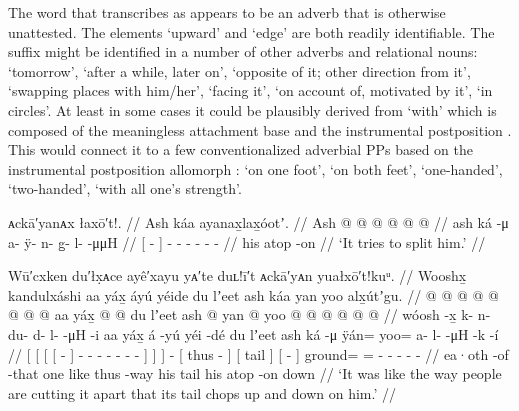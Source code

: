 The word that \citeauthor{swanton:1909} transcribes as  appears to be an adverb that is otherwise unattested.
The elements  ‘upward’ and  ‘edge’ are both readily identifiable.
The suffix  might be identified in a number of other adverbs and relational nouns:  ‘tomorrow’,  ‘after a while, later on’,  ‘opposite of it; other direction from it’,  ‘swapping places with him/her’,  ‘facing it’,  ‘on account of, motivated by it’,  ‘in circles’.
At least in some cases it could be plausibly derived from  ‘with’ which is composed of the meaningless attachment base  and the instrumental postposition .
This would connect it to a few conventionalized adverbial PPs based on the instrumental postposition allomorph :  ‘on one foot’,  ‘on both feet’,  ‘one-handed’,  ‘two-handed’,  ‘with all one’s strength’.

\ex\label{ex:91-239-split-him}%
%
\begingl
	\glpreamble	ᴀckā′yanᴀx łaxō′t!. //
	\glpreamble	Ash káa ayanax̱lax̱óotʼ. //
	\gla	{} Ash  @ {} {}
		 @ {} @ {} @ {} @ {} @ {} //
	\glb	{} ash ká -μ {}
		a- ÿ- n- g̱- l-  -μμH //
	\glc	{}[   - {}]
		- - - - -  - //
	\gld	{} his atop -on {}
		 {} {} {} {} {} //
	\glft	‘It tries to split him.’
		//
\endgl
\xe

\ex\label{ex:91-240-like-cut-apart-tail-repeatedly-chops}%
%
\begingl
	\glpreamble	Wū′cxken du′łx̣ᴀce ayê′xayu yᴀ′te duʟ!ī′t ᴀckā′yᴀn yuałxō′t!kuᵘ. //
	\glpreamble	Wooshx̱ kandulxáshi aa yáx̱ áyú yéide du lʼeet ash káa yan yoo alx̱útʼgu. //
	\gla	{} {} {} {}  @ {} {}
			 @ {} @ {} @ {} @ {} @ {} @ {} @ {} {}
			aa {} yáx̱ {}  @ {}
		{}  @ {} {} 
		{} du lʼeet {} {} ash  @ {} {}
		yan @ yoo @  @ {} @ {} @ {} @ {} @ {} //
	\glb	{} {} {} {} wóosh -x̱ {}
			k- n- du- d- l-  -μH -i {}
			aa {} yáx̱ {} á -yú
		{} yéi -dé {}
		{} du lʼeet {} {} ash ká -μ {}
		ÿán= yoo= a- l-  -μH -k -í //
	\glc	{}[ {}[ {}[ {}[  - {}]
			- - - - -
				 - - {}]
			 {}]  {}]  -
		{}[ thus - {}]
		{}[  tail {}]
		{}[   - {}]
		ground= = - -
			 - - - //
	\gld	{} {} {} {} ea·oth -of {}
			 {} {} {} {} {} {} -that {}
			one {} like {}  {}
		{} thus -way {}
		{} his tail {} {} his atop -on {}
		down   {} {} {} {} {} //
	\glft	‘It was like the way people are cutting it apart that its tail chops up and down on him.’
		//
\endgl
\xe

